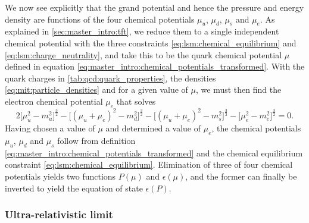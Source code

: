 We now see explicitly that the grand potential and hence the pressure and energy density are functions of the four chemical potentials $\mu_u$, $\mu_d$, $\mu_s$ and $\mu_e$.
As explained in \cref{sec:master_intro:tft},
we reduce them to a single independent chemical potential with the three constraints \eqref{eq:lsm:chemical_equilibrium} and \eqref{eq:lsm:charge_neutrality},
and take this to be the quark chemical potential $\mu$ defined in equation \eqref{eq:master_intro:chemical_potentials_transformed}.
With the quark charges in \cref{tab:qcd:quark_properties}, the densities \eqref{eq:mit:particle_densities} and for a given value of $\mu$,
we must then find the electron chemical potential $\mu_e$ that solves
\begin{equation}
	2 \Big[\mu_u^2-m_u^2\Big]^\frac32
	- \Big[(\mu_u+\mu_e)^2-m_d^2\Big]^\frac32 
	- \Big[(\mu_u+\mu_e)^2-m_s^2\Big]^\frac32 
	- \Big[\mu_e^2-m_e^2\Big]^\frac32 = 0.
\label{eq:mit:charge_neutrality_explicit}
\end{equation}
Having chosen a value of $\mu$ and determined a value of $\mu_e$,
the chemical potentials $\mu_u$, $\mu_d$ and $\mu_s$ follow from definition \eqref{eq:master_intro:chemical_potentials_transformed} and the chemical equilibrium constraint \eqref{eq:lsm:chemical_equilibrium}. 
Elimination of three of four chemical potentials yields two functions $P(\mu)$ and $\epsilon(\mu)$,
and the former can finally be inverted to yield the equation of state $\epsilon(P)$.

\subsubsection{Ultra-relativistic limit}

